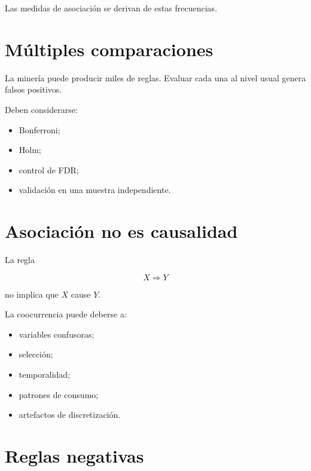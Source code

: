 \documentclass[
  spanish,
  10.5pt,
  letterpaper,
  DIV=11,
  numbers=noendperiod,
  oneside,
  open=any]{scrreprt}
\providecommand{\tightlist}{%
  \setlength{\itemsep}{0pt}\setlength{\parskip}{0pt}}
\theoremstyle{definition}
\theoremstyle{definition}
\theoremstyle{plain}
\theoremstyle{remark}
\begin{document}
Las medidas de asociación se derivan de estas frecuencias.

\section*{Múltiples comparaciones}\label{muxfaltiples-comparaciones}


La minería puede producir miles de reglas. Evaluar cada una al nivel
usual genera falsos positivos.

Deben considerarse:

\begin{itemize}
\tightlist
\item
  Bonferroni;
\item
  Holm;
\item
  control de FDR;
\item
  validación en una muestra independiente.
\end{itemize}

\section*{Asociación no es
causalidad}\label{asociaciuxf3n-no-es-causalidad}


La regla

\[
X\Rightarrow Y
\]

no implica que \(X\) cause \(Y\).

La coocurrencia puede deberse a:

\begin{itemize}
\tightlist
\item
  variables confusoras;
\item
  selección;
\item
  temporalidad;
\item
  patrones de consumo;
\item
  artefactos de discretización.
\end{itemize}

\section*{Reglas negativas}\label{reglas-negativas}
\end{document}
